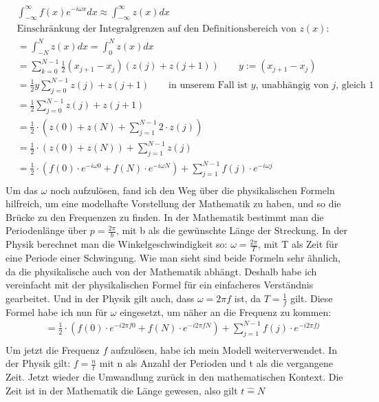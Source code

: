 \documentclass[a4paper,12pt]{article}
\theoremstyle{definition}
\theoremstyle{remark}
\begin{document}
\begin{align*}
& \int_{-\infty}^\infty{f(x)e^{-i\omega x} dx} \approx \int_{-\infty}^\infty{z(x) dx}\\ 
&\text{Einschränkung der Integralgrenzen auf den Definitionsbereich von $z(x)$: }\\
& =\int_{-N}^{N}{z(x)dx} = \int_{0}^{N}{z(x)dx} \\
&= \sum_{k = 0}^{N-1}{\frac{1}{2}(x_{j+1}-x_j)(z(j) + z(j+1))} \qquad y:= (x_{j+1}-x_j)\\
& =\frac{1}{2} y \sum_{j=0}^{N-1} z(j)+z(j+1) \qquad \text{in unserem Fall ist $y$, unabhängig von $j$, gleich $1$} \\
& =\frac{1}{2} \sum_{j=0}^{N-1} z(j)+z(j+1) \\
& =\frac{1}{2} \cdot\left(z(0)+z(N)+\sum_{j=1}^{N-1} 2 \cdot z(j)\right) \\
& =\frac{1}{2} \cdot(z(0)+z(N))+\sum_{j=1}^{N-1} z(j) \\
& =\frac{1}{2} \cdot\left(f(0) \cdot e^{-i \omega 0}+f(N) \cdot e^{-i \omega N}\right)+\sum_{j=1}^{N-1} f(j) \cdot e^{-i \omega j} \\
\end{align*}
Um das $\omega$ noch aufzulösen, fand ich den Weg über die physikalischen Formeln hilfreich, um eine 
modelhafte Vorstellung der Mathematik zu haben, und so die Brücke zu den Frequenzen zu finden. In der Mathematik 
bestimmt man die Periodenlänge über $p = \frac{2\pi}{b}$, mit b als die gewünschte Länge der Streckung. In der Physik 
berechnet man die Winkelgeschwindigkeit so: $\omega = \frac{2\pi}{T}$, mit T als Zeit für eine Periode einer Schwingung. 
Wie man sieht sind beide Formeln sehr ähnlich, da die physikalische auch von der Mathematik abhängt. Deshalb 
habe ich vereinfacht mit der physikalischen Formel für ein einfacheres Verständnis gearbeitet. Und in der Physik 
gilt auch, dass $\omega = 2\pi f$ ist, da $T = \frac{1}{f}$ gilt. Diese Formel habe ich nun für $\omega$ eingesetzt, 
um näher an die Frequenz zu kommen:
\begin{align*}
& =\frac{1}{2} \cdot\left(f(0) \cdot e^{-i 2 \pi f 0}+f(N) \cdot e^{-i 2 \pi f N}\right)+\sum_{j=1}^{N-1} f(j) \cdot e^{-i 2 \pi f j} \\
\end{align*}
Um jetzt die Frequenz $f$ aufzulösen, habe ich mein Modell weiterverwendet. In der Physik gilt: 
$f = \frac{n}{t}$ mit n als Anzahl der Perioden und t als die vergangene Zeit. Jetzt wieder die Umwandlung 
zurück in den mathematischen Kontext. Die Zeit ist in der Mathematik die Länge gewesen, also gilt $t \widehat{=} N$
\end{document}
